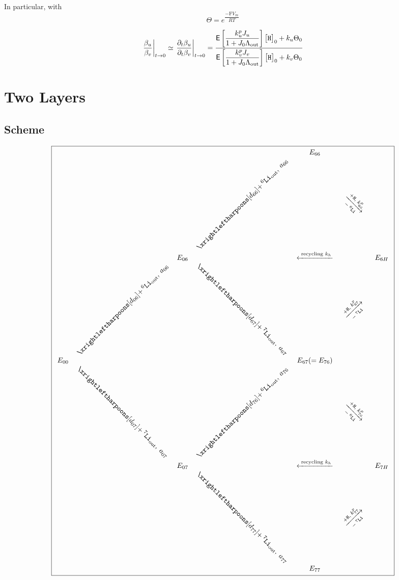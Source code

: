 \documentclass[aps,onecolumn,11pt]{revtex4}
\newcommand{\mychem}[1]{\mathtt{#1}}
\newcommand{\myconc}[1]{\big[#1\big]}
\newcommand{\Faraday}{\mathrm{F}}
\newcommand{\spLi}[1]{{\!~^{#1}\mychem{Li}}}
\newcommand{\spproton}{\mychem{H}}
\newcommand{\proton}{\myconc{\spproton}}
\newcommand{\myout}[1]{{#1}_{\tiny\mathrm{out}}}
\newcommand{\spLiOut}[1]{\myout{\spLi{#1}}}
\newcommand{\myrotate}[2]{\rotatebox[origin=c]{#1}{#2}}
\newcommand{\LiAll}{\Lambda}
\newcommand{\LiAllOut}{\myout{\LiAll}}
\begin{document}
In particular, with
\begin{equation}
	\Theta = e^{\dfrac{-\Faraday V_m }{RT}}
\end{equation}

\begin{equation}
	\left.\dfrac{\beta_u}{\beta_v}\right\vert_{t\to0} \simeq \left.\dfrac{\partial_t \beta_u}{\partial_t\beta_v}\right\vert_{t\to0}
	= \dfrac{\mathsf{E} \left[\dfrac{k^p_u J_u}{1+J_0 \LiAllOut}\right] \proton_0 + k_u  \Theta_0
	}
	{
	\mathsf{E} \left[\dfrac{k^p_v J_v}{1+J_0 \LiAllOut}\right] \proton_0 + k_v  \Theta_0
	}
\end{equation}


\section{Two Layers}
\subsection{Scheme}

\begin{equation}
\boxed{
\begin{array}{ccccccc}
 & &        &                                                  & E_{66} & & \\
 & &        & \myrotate{45}{$\xrightleftharpoons[d_{66}]{+\spLiOut{6},\;a_{66}}$} & &  \myrotate{-45}{$\xrightarrow[-\spLi{6}]{+ \spproton, \; k^p_{66}}$}& \\
 & & E_{06} &  & \xleftarrow{\text{ recycling } k_h } & & E_{6H}\\
 &  \myrotate{45}{$\xrightleftharpoons[d_{06}]{+\spLiOut{6},\;a_{06}}$} &   & \myrotate{-45}{$\xrightleftharpoons[d_{67}]{+\spLiOut{7},\;a_{67}}$} & & \myrotate{45}{$\xrightarrow[-\spLi{7}]{+ \spproton, \; k^p_{67}}$}&\\
E_{00} & &  & & E_{67}(=E_{76}) & & \\ 
  & \myrotate{-45}{$\xrightleftharpoons[d_{07}]{+\spLiOut{7},\;a_{07}}$} &  & \myrotate{45}{$\xrightleftharpoons[d_{76}]{+\spLiOut{6},\;a_{76}}$} & & \myrotate{-45}{$\xrightarrow[-\spLi{6}]{+ \spproton, \; k^p_{76}}$} & \\
  & & E_{07} &   & \xleftarrow{\text{ recycling } k_h } & & E_{7H}\\
  & &  & \myrotate{-45}{$\xrightleftharpoons[d_{77}]{+\spLiOut{7},\;a_{77}}$} & & \myrotate{45}{$\xrightarrow[-\spLi{7}]{+ \spproton, \; k^p_{77}}$} &\\
  & &  &  & E_{77} & &\\

 \end{array}
 }
\end{equation}
\end{document}
